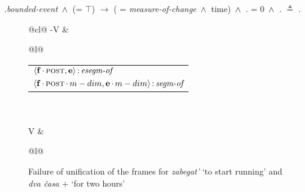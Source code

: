 \ex.\label{constr:duration}\textit{bounded-event} $\,\wedge\,$ (\DURATION = $\top$) $\rightarrow$ ({\scshape\MDIM} = \textit{measure-of-change} $\,\wedge\,$ time) $\,\wedge\,$  {\scshape\MDIM} . \MIN = 0 $\,\wedge\,$ {\scshape\MDIM} . \MAX $\triangleq$ \DURATION .\VAL



\begin{figure}
\hfill
\begin{tabular}[t]{@{}cl@{}}
-V &
\begin{tabular}[t]{@{}l@{}}
\\
\end{tabular}
\begin{footnotesize}
\begin{tabular}[t]{@{}l@{}}
$\langle{\textbf{\textrm{f}}\,{\cdot}\,\textsc{post},\textbf{\textrm{e}}}\rangle\,{:}\,\textit{esegm-of}$\\[1ex]
$\tuple{\btag{f}\BC\POST\C\MDIM,\btag{e}\BC\MDIM}\D\type{segm-of}$\\
\end{tabular}
\end{footnotesize}
\\\\
V &
\begin{tabular}[t]{@{}l@{}}
\\
\end{tabular}
\end{tabular}
\hfill
\caption{Failure of unification of the frames for \textit{zabegat'} `to start running' and \textit{dva \v{c}asa}  + `for two hours'}
\label{frame:zabegat:2hours}
\end{figure}

